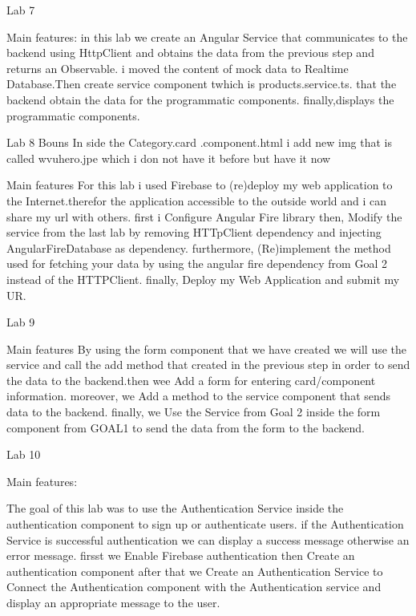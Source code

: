 Lab 7

Main features:
in this lab we create an Angular Service that communicates to the backend using HttpClient and obtains the data from the previous step and returns an Observable. 
i moved the content of mock data to Realtime Database.Then create service component twhich  is products.service.ts. that the backend obtain the data for the programmatic components.
finally,displays the programmatic components.



Lab 8
 Bouns 
 In side the Category.card .component.html i add new img that is called wvuhero.jpe which i don not have it before but have it now 

 Main features
 For this lab i used Firebase to (re)deploy my web application to the Internet.therefor the application accessible to the outside world and i can share my url with others.
first i Configure Angular Fire library then, Modify the service from the last lab by removing HTTpClient dependency and injecting AngularFireDatabase as dependency.
furthermore, (Re)implement the method used for fetching your data by using the angular fire dependency from Goal 2 instead of the HTTPClient.
finally,  Deploy my Web Application and submit my UR.

 Lab 9

 Main features
 By using the form component that we have  created we will use the service and call the add method that created in the previous 
 step in order to send the data to the backend.then wee Add a form for entering card/component information.
moreover, we Add a method to the service component that sends data to the backend. finally, we
Use the Service from Goal 2 inside the form component from GOAL1 to send the data from the form to the backend.


Lab 10

Main features:

The goal of this lab was to use the Authentication Service inside the authentication component to sign up or authenticate users.
if the Authentication Service is successful authentication we can  display a success message otherwise an error message. 
firsst we Enable Firebase authentication then Create an authentication component after that we Create an Authentication Service 
to Connect the Authentication component with the Authentication service and display an appropriate message to the user.


